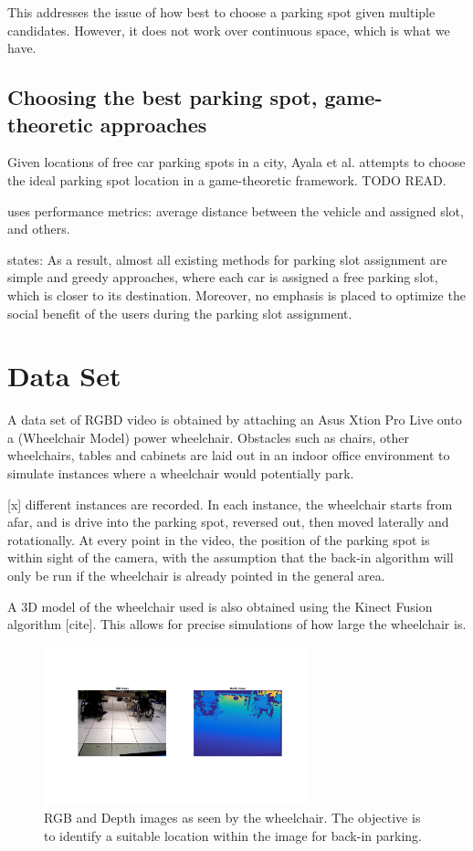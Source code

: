 This addresses the issue of how best to choose a parking spot given multiple
candidates. However, it does not work over continuous space, which is what we
have.

\subsection{Choosing the best parking spot, game-theoretic approaches}
Given locations of free car parking spots in a city, Ayala et al.
\cite{ayala2011parking} attempts to choose the ideal parking spot location
in a game-theoretic framework. TODO READ.
\cite{ayala2012parking}

\cite{mejri2014cooperation} uses performance metrics: average distance between
the vehicle and assigned slot, and others.

\cite{alfonsetti2014semi} states: 
As a result, almost all existing methods for parking slot assignment are simple
and greedy approaches, where each car is assigned a free parking slot, which is
closer to its destination. Moreover, no emphasis is placed to optimize the
social benefit of the users during the parking slot assignment. 


\section{Data Set}
\label{sec:rgbddataset}
A data set of RGBD video is obtained by attaching an Asus Xtion Pro Live onto a
(Wheelchair Model) power wheelchair. Obstacles such as chairs, other
wheelchairs, tables and cabinets are laid out in an indoor office environment to
simulate instances where a wheelchair would potentially park.

[x] different instances are recorded. In each instance, the wheelchair starts
from afar, and is drive into the parking spot, reversed out, then moved
laterally and rotationally. At every point in the video, the position of the
parking spot is within sight of the camera, with the assumption that the back-in
algorithm will only be run if the wheelchair is already pointed in the general
area.

A 3D model of the wheelchair used is also obtained using the Kinect Fusion
algorithm [cite]. This allows for precise simulations of how large the
wheelchair is.

\begin{figure}
\centering
\includegraphics[width=3in]{figures/rgbdwheelchair.png}
\caption{RGB and Depth images as seen by the wheelchair. The objective is to
identify a suitable location within the image for back-in parking.}
\label{fig:rgbdwheelchair}
\end{figure}



